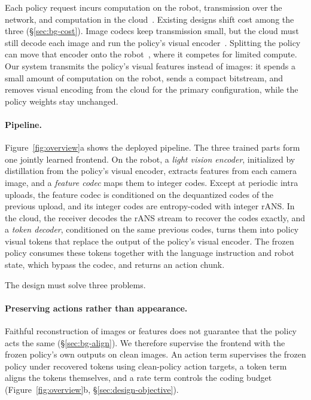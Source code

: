 Each policy request incurs computation on the robot, transmission over the
network, and computation in the cloud~\cite{neurosurgeon,roboecc}.
Existing designs shift cost among the three (\S\ref{sec:bg-cost}). Image
codecs keep transmission small, but the cloud must still decode each image
and run the policy's visual encoder~\cite{limitnet,sparc}. Splitting the
policy can move that encoder onto the robot~\cite{roboecc}, where it
competes for limited compute. Our system transmits the policy's visual
features instead of images: it spends a small amount of computation on the
robot, sends a compact bitstream, and removes visual encoding from the
cloud for the primary configuration, while the policy weights stay unchanged.

\paragraph{Pipeline.}
Figure~\ref{fig:overview}a shows the deployed pipeline. The three trained
parts form one jointly learned frontend. On the robot, a \emph{light vision
encoder}, initialized by distillation from the policy's visual encoder,
extracts features from each camera image, and a \emph{feature codec} maps
them to integer codes. Except at periodic intra uploads, the
feature codec is conditioned on the dequantized codes of the previous
upload, and its integer codes are entropy-coded with integer rANS. In the
cloud, the receiver decodes the rANS stream to recover the codes exactly,
and a \emph{token decoder}, conditioned on the same previous codes, turns
them into policy visual tokens that replace the output of the policy's
visual encoder. The frozen policy consumes these tokens together
with the language instruction and robot state, which bypass the codec, and
returns an action chunk.

The design must solve three problems.

\paragraph{Preserving actions rather than appearance.}
Faithful reconstruction of images or features does not guarantee that the
policy acts the same (\S\ref{sec:bg-align}). We therefore supervise the
frontend with the frozen policy's own outputs on clean images. An action term supervises the frozen policy under recovered tokens
using clean-policy action targets, a token term aligns the tokens
themselves, and a rate term controls the coding budget
(Figure~\ref{fig:overview}b, \S\ref{sec:design-objective}).

